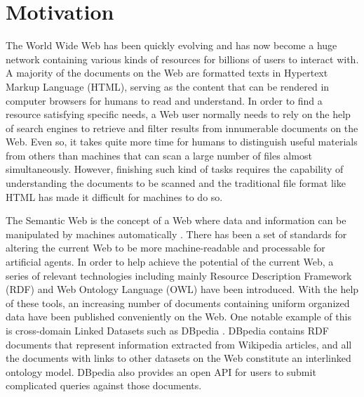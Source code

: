 


\section{Motivation} \label{section:motivation}
The World Wide Web has been quickly evolving and has now become a huge network containing various kinds of resources for billions of users to interact with. A majority of the documents on the Web are formatted texts in Hypertext Markup Language (HTML), serving as the content that can be rendered in computer browsers for humans to read and understand. In order to find a resource satisfying specific needs, a Web user normally needs to rely on the help of search engines to retrieve and filter results from innumerable documents on the Web. Even so, it takes quite more time for humans to distinguish useful materials from others than machines that can scan a large number of files almost simultaneously. However, finishing such kind of tasks requires the capability of understanding the documents to be scanned and the traditional file format like HTML has made it difficult for machines to do so.

The Semantic Web is the concept of a Web where data and information can be manipulated by machines automatically \cite{Shadbolt2006}. There has been a set of standards for altering the current Web to be more machine-readable and processable for artificial agents. In order to help achieve the potential of the current Web, a series of relevant technologies including mainly Resource Description Framework (RDF) \cite{Cyganiak2014} and Web Ontology Language (OWL) have been introduced. With the help of these tools, an increasing number of documents containing uniform organized data have been published conveniently on the Web. One notable example of this is cross-domain Linked Datasets such as DBpedia \cite{Auer2007}. DBpedia contains RDF documents that represent information extracted from Wikipedia articles, and all the documents with links to other datasets on the Web constitute an interlinked ontology model. DBpedia also provides an open API for users to submit complicated queries against those documents.

